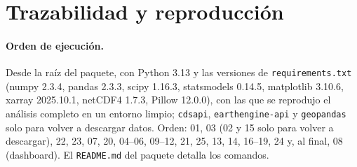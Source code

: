 \documentclass[11pt,a4paper]{article}
\newcommand{\archivo}[1]{\nolinkurl{#1}}
\begin{document}
\appendix
\section{Trazabilidad y reproducción}
\label{sec:anexoA}

\paragraph{Orden de ejecución.} Desde la raíz del paquete, con Python 3.13 y las versiones de \archivo{requirements.txt} (numpy 2.3.4, pandas 2.3.3, scipy 1.16.3, statsmodels 0.14.5, matplotlib 3.10.6, xarray 2025.10.1, netCDF4 1.7.3, Pillow 12.0.0), con las que se reprodujo el análisis completo en un entorno limpio; \texttt{cdsapi}, \texttt{earthengine-api} y \texttt{geopandas} solo para volver a descargar datos. Orden: 01, 03 (02 y 15 solo para volver a descargar), 22, 23, 07, 20, 04--06, 09--12, 21, 25, 13, 14, 16--19, 24 y, al final, 08 (dashboard). El \archivo{README.md} del paquete detalla los comandos.
\end{document}

